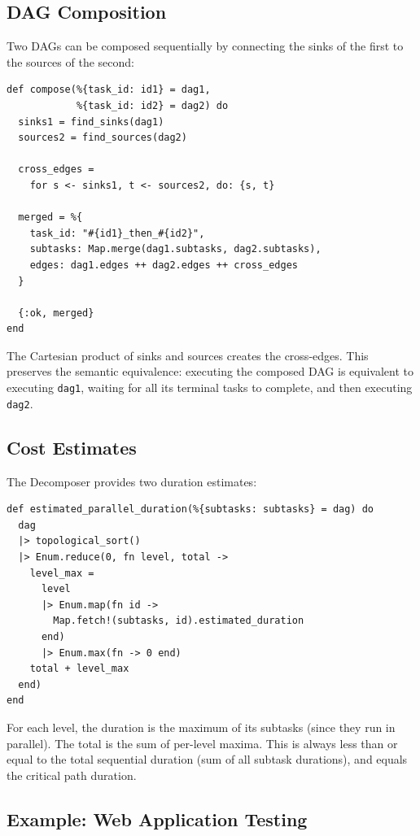 \documentclass[12pt,a4paper]{article}
\theoremstyle{plain}
\theoremstyle{definition}
\begin{document}
\subsection{DAG Composition}

Two DAGs can be composed sequentially by connecting the sinks of the first to the sources of the second:

\begin{lstlisting}[caption={Functorial DAG composition},label={lst:decomp-compose}]
def compose(%{task_id: id1} = dag1,
            %{task_id: id2} = dag2) do
  sinks1 = find_sinks(dag1)
  sources2 = find_sources(dag2)

  cross_edges =
    for s <- sinks1, t <- sources2, do: {s, t}

  merged = %{
    task_id: "#{id1}_then_#{id2}",
    subtasks: Map.merge(dag1.subtasks, dag2.subtasks),
    edges: dag1.edges ++ dag2.edges ++ cross_edges
  }

  {:ok, merged}
end
\end{lstlisting}

The Cartesian product of sinks and sources creates the cross-edges. This preserves the semantic equivalence: executing the composed DAG is equivalent to executing \texttt{dag1}, waiting for all its terminal tasks to complete, and then executing \texttt{dag2}.

\subsection{Cost Estimates}

The Decomposer provides two duration estimates:

\begin{lstlisting}[caption={Parallel duration estimation},label={lst:decomp-duration}]
def estimated_parallel_duration(%{subtasks: subtasks} = dag) do
  dag
  |> topological_sort()
  |> Enum.reduce(0, fn level, total ->
    level_max =
      level
      |> Enum.map(fn id ->
        Map.fetch!(subtasks, id).estimated_duration
      end)
      |> Enum.max(fn -> 0 end)
    total + level_max
  end)
end
\end{lstlisting}

For each level, the duration is the maximum of its subtasks (since they run in parallel). The total is the sum of per-level maxima. This is always less than or equal to the total sequential duration (sum of all subtask durations), and equals the critical path duration.

\subsection{Example: Web Application Testing}
\end{document}
